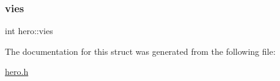 \mbox{\label{structhero_a3bfdfabb0cc2c40d7144ba899a22bc7b}} 
\subsubsection{\texorpdfstring{vies}{vies}}
{\footnotesize\ttfamily int hero\+::vies}



The documentation for this struct was generated from the following file\+:\begin{DoxyCompactItemize}
\item 
\hyperlink{hero_8h}{hero.\+h}\end{DoxyCompactItemize}
